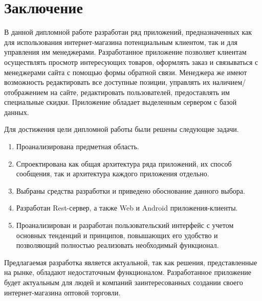 \section{Заключение}\label{sec:closing}\indent

В данной дипломной работе разработан ряд приложений, предназначенных как для использования интернет-магазина потенциальным клиентом, так и для управления им менеджерами.
Разработанное приложение позволяет клиентам осуществлять просмотр интересующих товаров, оформлять заказ и связываться с менеджерами сайта с помощью формы обратной связи.
Менеджера же имеют возможность редактировать все доступные позиции, управлять их наличием/отображением на сайте, редактировать пользователей, предоставлять им специальные скидки.
Приложение обладает выделенным сервером с базой данных.

Для достижения цели дипломной работы были решены следующие задачи.
\begin{enumerate}
    \item Проанализирована предметная область.
    \item Спроектирована как общая архитектура ряда приложений, их способ сообщения, так и архитектура каждого приложения отдельно.
    \item Выбраны средства разработки и приведено обоснование данного выбора.
    \item Разработан Rest-сервер, а также Web и Android приложения-клиенты.
    \item Проанализирован и разработан пользовательский интерфейс с учетом основных тенденций и принципов, повышающих его удобство и позволяющий полностью реализовать необходимый функционал.
\end{enumerate}

Предлагаемая разработка является актуальной, так как решения, представленные на рынке, обладают недостаточным функционалом.
Разработанное приложение будет актуальным для людей и компаний заинтересованных создании своего интернет-магазина оптовой торговли.
